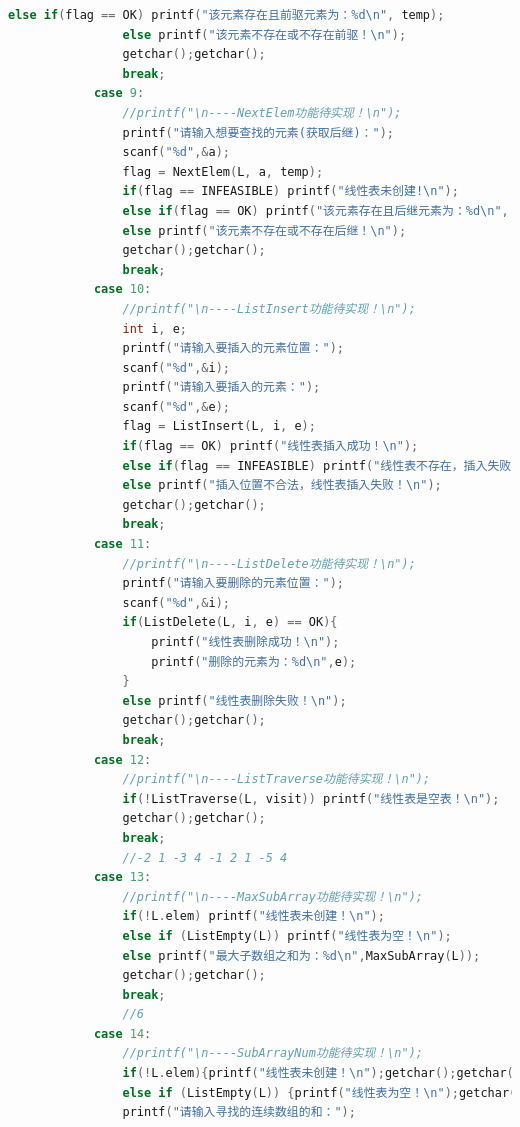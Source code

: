 \documentclass[supercite]{Experimental_Report}
\theoremstyle{definition}
\begin{document}
\begin{lstlisting}[language=c]
                else if(flag == OK) printf("该元素存在且前驱元素为：%d\n", temp);
                else printf("该元素不存在或不存在前驱！\n");
                getchar();getchar();
                break;
            case 9:
                //printf("\n----NextElem功能待实现！\n");
                printf("请输入想要查找的元素(获取后继)：");
                scanf("%d",&a);
                flag = NextElem(L, a, temp);
                if(flag == INFEASIBLE) printf("线性表未创建!\n");
                else if(flag == OK) printf("该元素存在且后继元素为：%d\n", temp);
                else printf("该元素不存在或不存在后继！\n");
                getchar();getchar();
                break;
            case 10:
                //printf("\n----ListInsert功能待实现！\n");
                int i, e;
                printf("请输入要插入的元素位置：");
                scanf("%d",&i);
                printf("请输入要插入的元素：");
                scanf("%d",&e);
                flag = ListInsert(L, i, e);
                if(flag == OK) printf("线性表插入成功！\n");
                else if(flag == INFEASIBLE) printf("线性表不存在，插入失败！\n"); 
				else printf("插入位置不合法，线性表插入失败！\n");
                getchar();getchar();
                break;
            case 11:
                //printf("\n----ListDelete功能待实现！\n");
                printf("请输入要删除的元素位置：");
                scanf("%d",&i);
                if(ListDelete(L, i, e) == OK){
                	printf("线性表删除成功！\n");
                	printf("删除的元素为：%d\n",e); 
				} 
                else printf("线性表删除失败！\n");
                getchar();getchar();
                break;
            case 12:
                //printf("\n----ListTraverse功能待实现！\n");
                if(!ListTraverse(L, visit)) printf("线性表是空表！\n");
                getchar();getchar();
                break;
                //-2 1 -3 4 -1 2 1 -5 4 
            case 13:
                //printf("\n----MaxSubArray功能待实现！\n");
                if(!L.elem) printf("线性表未创建！\n");
                else if (ListEmpty(L)) printf("线性表为空！\n");
                else printf("最大子数组之和为：%d\n",MaxSubArray(L));
                getchar();getchar();
                break;
                //6 
            case 14:
                //printf("\n----SubArrayNum功能待实现！\n");
                if(!L.elem){printf("线性表未创建！\n");getchar();getchar();break;}
                else if (ListEmpty(L)) {printf("线性表为空！\n");getchar();getchar();break;}
                printf("请输入寻找的连续数组的和：");

\end{lstlisting}
\end{document}
